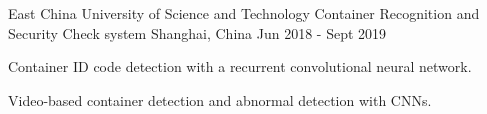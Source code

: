 \begin{cventries}
  \cventry
    {East China University of Science and Technology} %
    {Container Recognition and Security Check system} %
    {Shanghai, China} %
    {Jun 2018 - Sept 2019} %
    {
      \begin{cvitems} %
        \item {Container ID code detection with a recurrent convolutional neural network.}
        \item {Video-based container detection and abnormal detection with CNNs.}
      \end{cvitems}
    }

\end{cventries}

